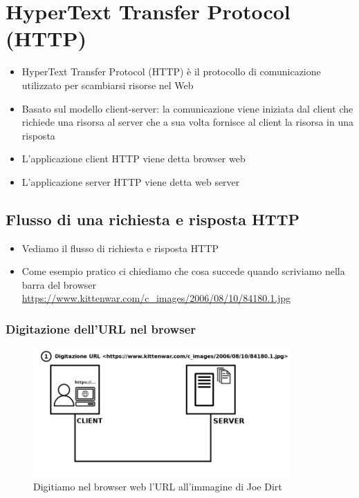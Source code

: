 \documentclass{beamer}
\begin{document}
\section{HyperText Transfer Protocol (HTTP)}
\begin{frame}{\insertsection}
\begin{itemize}
\item \alert{HyperText Transfer Protocol (HTTP)} è il protocollo di
comunicazione utilizzato per scambiarsi risorse nel Web
\item Basato sul modello \alert{client-server}: la comunicazione viene iniziata
dal \alert{client} che \alert{richiede} una \alert{risorsa} al \alert{server} che a sua
volta fornisce al client la risorsa in una \alert{risposta}
\item L'applicazione client HTTP viene detta \alert{browser web}
\item L'applicazione server HTTP viene detta \alert{web server}
\end{itemize}
\end{frame}

\subsection*{Flusso di una richiesta e risposta HTTP}
\begin{frame}{\insertsection}{\insertsubsection}
\begin{itemize}
\item Vediamo il flusso di richiesta e risposta HTTP
\item Come esempio pratico ci chiediamo che cosa succede quando
scriviamo nella barra del browser
\url{https://www.kittenwar.com/c\_images/2006/08/10/84180.1.jpg}
\end{itemize}
\end{frame}

\subsubsection*{Digitazione dell'URL nel browser}
\begin{frame}{\insertsubsection}{\insertsubsubsection}
\begin{figure}
\includegraphics[width=0.88\textwidth]{imgs/http-kittenwar-1.png}
\caption{Digitiamo nel browser web l'URL all'immagine di Joe Dirt}
\end{figure}
\end{frame}
\end{document}
